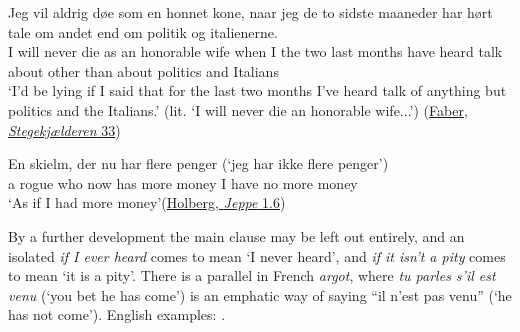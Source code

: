 \ex
\gll Jeg vil aldrig døe som en honnet kone, naar jeg de to sidste maaneder har hørt tale om andet end om politik og italienerne.\\
 I will never die as an honorable wife when I the two last months have heard talk about other than about politics and Italians\\
\glt `I'd be lying if I said that for the last two months I've heard talk of anything but politics and the Italians.' (lit. `I will never die an honorable wife...')
\hfill(\href{https://www.kb.dk/e-mat/dod/130024712320-color.pdf}{Faber, \textit{Stegekjælderen} 33})
\z
\z

\ea \label{ex:04-80}
\gll En skielm, der nu har flere penger {\phantom{x}} (`jeg har ikke flere penger')\\
a rogue who now has more money {\phantom{x}} I have no more money\\
\glt `As if I had more money'\hfill(\href{https://books.google.com/books?id=s94jACPhoMoC&pg=PA15&lpg=PA15&dq=\%22skielm+der+nu+har+flere+penger%22+holberg&source=bl&ots=8Ei1uK2suF&sig=ACfU3U1_nI2dJe2UXyxsNpVAxkzqY1JHkw&hl=en&sa=X&ved=2ahUKEwiSr-S2lcWEAxVJk1YBHZDVDJQQ6AF6BAgIEAM#v=onepage&q=\%22skielm%20der%20nu%20har%20flere%20penger%22%20holberg&f=false}{Holberg, \textit{Jeppe} 1.6}) %
\z

By a further development the main clause may be left out entirely, and an isolated \textit{if I ever heard} comes to mean `I never heard', and \textit{if it isn't a pity} comes to mean `it is a pity'. There is a parallel in French \textit{argot}, where \textit{tu parles s'il est venu} (`you bet he has come') is an emphatic way of saying ``il n'est pas venu'' (`he has not come'). English examples: .

